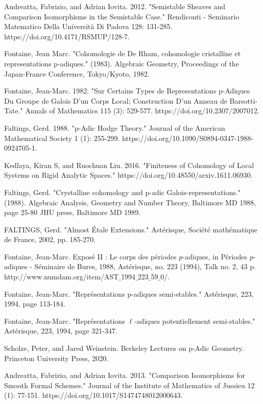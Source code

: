 \documentclass[12pt]{book}
\theoremstyle{definition}
\begin{document}
\begin{thebibliography}{}
 Andreatta, Fabrizio, and Adrian Iovita. 2012. "Semistable Sheaves and Comparison Isomorphisms in the Semistable Case." Rendiconti - Seminario Matematico Della Universit\`a Di Padova 128: 131-285. https://doi.org/10.4171/RSMUP/128-7.

 Fontaine, Jean Marc. "Cohomologie de De Rham, cohomologie cristalline et representations p-adiques." (1983). Algebraic Geometry, Proceedings of the Japan-France Conference, Tokyo/Kyoto, 1982.

 Fontaine, Jean-Marc. 1982. "Sur Certains Types de Representations p-Adiques Du Groupe de Galois D'un Corps Local; Construction D'un Anneau de Barsotti-Tate." Annals of Mathematics 115 (3): 529-577. https://doi.org/10.2307/2007012.

 Faltings, Gerd. 1988. "p-Adic Hodge Theory." Journal of the American Mathematical Society 1 (1): 255-299. https://doi.org/10.1090/S0894-0347-1988-0924705-1.

 Kedlaya, Kiran S, and Ruochuan Liu. 2016. "Finiteness of Cohomology of Local Systems on Rigid Analytic Spaces." https://doi.org/10.48550/arxiv.1611.06930.

 Faltings, Gerd. "Crystalline cohomology and p-adic Galois-representations." (1988). Algebraic Analysis, Geometry and Number Theory, Baltimore MD 1988, page 25-80 JHU press, Baltimore MD 1989.

 FALTINGS, Gerd. "Almost \'Etale Extensions." Ast\'erisque, Soci\'et\'e math\'ematique de France, 2002, pp. 185-270.

 Fontaine, Jean-Marc. Expos\'e II : Le corps des p\'eriodes $p$-adiques, in P\'eriodes $p$-adiques - S\'eminaire de Bures, 1988, Ast\'erisque, no. 223 (1994), Talk no. 2, 43 p. http://www.numdam.org/item/AST$\_$1994$\_$223$\_$59$\_$0/.

 Fontaine, Jean-Marc. "Repr\'esentations p-adiques semi-stables." Ast\'erisque, 223, 1994, page 113-184.

 Fontaine, Jean-Marc. "Repr\'esentations $\ell$-adiques potentiellement semi-stables." Ast\'erisque, 223, 1994, page 321-347.

 Scholze, Peter, and Jared Weinstein. Berkeley Lectures on p-Adic Geometry. Princeton University Press, 2020.

 Andreatta, Fabrizio, and Adrian Iovita. 2013. "Comparison Isomorphisms for Smooth Formal Schemes." Journal of the Institute of Mathematics of Jussieu 12 (1): 77-151. https://doi.org/10.1017/S1474748012000643.


\end{thebibliography}
\end{document}
